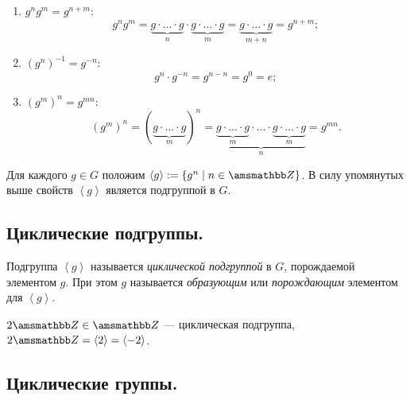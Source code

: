 \begin{properties}
  \begin{enumerate}[label = \arabic*)]
    \item $g^ng^m = g^{n + m}$:
    \[
      g^ng^m = \underbrace{g \cdot \ldots \cdot g}_n \cdot
      \underbrace{g \cdot \ldots \cdot g}_m =
      \underbrace{g \cdot \ldots \cdot g}_{m + n} = g^{n + m}; 
    \]
    \item $(g^n)^{-1} = g^{-n}$:
    \[
      g^n \cdot g^{-n} = g^{n - n} = g^0 = e;
    \]
    \item $(g^m)^n = g^{mn}$:
    \[
      (g^m)^n = (\underbrace{g \cdot \ldots \cdot g}_m)^n= 
      \underbrace{
      \underbrace{g \cdot \ldots \cdot g}_m \cdot \ldots \cdot 
      \underbrace{g \cdot \ldots \cdot g}_m}_n = g^{mn}.
    \]
  \end{enumerate}
\end{properties}

Для каждого $g \in G$ положим 
$\left<g\right> := \{g^n \mid n \in \ZZ \}$.
В силу упомянутых выше свойств $\left<g\right>$
является подгруппой в $G$.

\vspace{0.4cm}

\subsection{Циклические подгруппы.}

\begin{definition}
  Подгруппа $\left<g\right>$ называется
  \textit{циклической подгруппой} в $G$, 
  порождаемой элементом $g$.
  При этом $g$ называется \textit{образующим} или 
  \textit{порождающим} элементом для $\left<g\right>$.
\end{definition}

\begin{example}
  $2\ZZ \in \ZZ$ --- циклическая подгруппа,
  $2\ZZ = \left<2\right> = \left<-2\right>$.
\end{example}

\vspace{0.3cm}

\begin{comment}
  Циклическая подгруппа $\left<g\right>$ всегда коммутативна.
\end{comment}

\newpage
\subsection{Циклические группы.}
\vspace{0.3cm}


